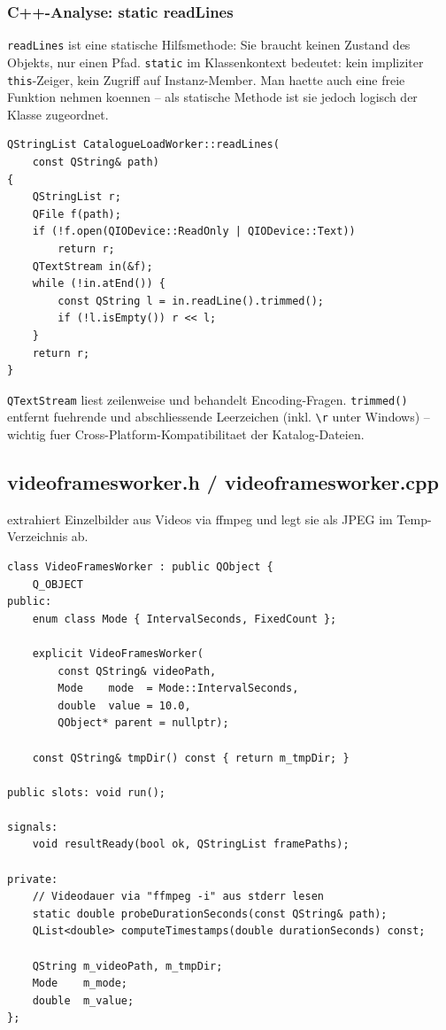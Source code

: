 \subsubsection{C++-Analyse: static readLines}

\verb|readLines| ist eine statische Hilfsmethode:
Sie braucht keinen Zustand des Objekts, nur einen Pfad.
\verb|static| im Klassenkontext bedeutet: kein impliziter
\verb|this|-Zeiger, kein Zugriff auf Instanz-Member.
Man haette auch eine freie Funktion nehmen koennen --
als statische Methode ist sie jedoch logisch der Klasse
zugeordnet.

\begin{lstlisting}[caption={CatalogueLoadWorker::readLines}]
QStringList CatalogueLoadWorker::readLines(
    const QString& path)
{
    QStringList r;
    QFile f(path);
    if (!f.open(QIODevice::ReadOnly | QIODevice::Text))
        return r;
    QTextStream in(&f);
    while (!in.atEnd()) {
        const QString l = in.readLine().trimmed();
        if (!l.isEmpty()) r << l;
    }
    return r;
}
\end{lstlisting}

\verb|QTextStream| liest zeilenweise und behandelt
Encoding-Fragen. \verb|trimmed()| entfernt fuehrende
und abschliessende Leerzeichen (inkl. \verb|\r| unter
Windows) -- wichtig fuer Cross-Platform-Kompatibilitaet
der Katalog-Dateien.

\subsection{videoframesworker.h / videoframesworker.cpp}

 extrahiert Einzelbilder aus
Videos via ffmpeg und legt sie als JPEG im Temp-Verzeichnis
ab.

\begin{lstlisting}[style=header, caption={videoframesworker.h -- Kern}]
class VideoFramesWorker : public QObject {
    Q_OBJECT
public:
    enum class Mode { IntervalSeconds, FixedCount };

    explicit VideoFramesWorker(
        const QString& videoPath,
        Mode    mode  = Mode::IntervalSeconds,
        double  value = 10.0,
        QObject* parent = nullptr);

    const QString& tmpDir() const { return m_tmpDir; }

public slots: void run();

signals:
    void resultReady(bool ok, QStringList framePaths);

private:
    // Videodauer via "ffmpeg -i" aus stderr lesen
    static double probeDurationSeconds(const QString& path);
    QList<double> computeTimestamps(double durationSeconds) const;

    QString m_videoPath, m_tmpDir;
    Mode    m_mode;
    double  m_value;
};
\end{lstlisting}

